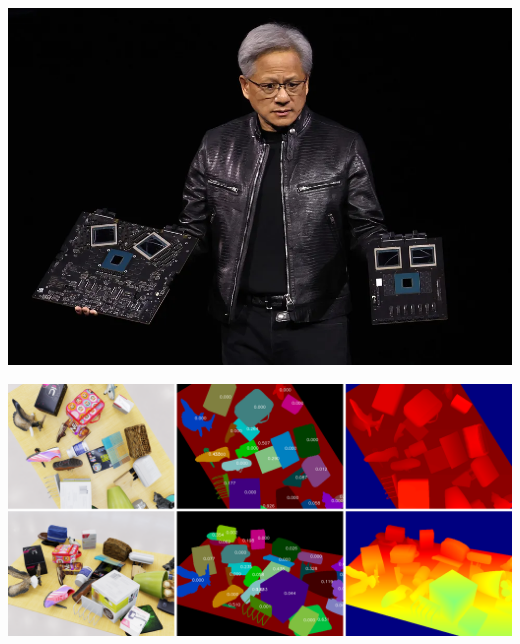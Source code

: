 \documentclass{beamer}
\begin{document}
\begin{frame}
\centering
\begin{minipage}{0.3\textwidth}
    \centering
    \includegraphics[width=\textwidth]{images/faster-GPUs.png} %
\end{minipage}
\hspace{0.05\linewidth}
\begin{minipage}{0.4\textwidth}
    \centering
    \includegraphics[width=\textwidth]{images/train_data_vis.png} %
\end{minipage}

\end{frame}

\end{document}
